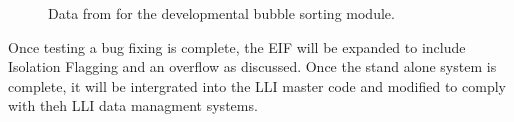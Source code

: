 		\begin{figure}[h]
			\centering
			\caption{Data from for the developmental bubble sorting module.}
			\label{fig:bubble_data_flow}
		\end{figure}

		Once testing a bug fixing is complete, the EIF will be expanded to include Isolation Flagging and an overflow as discussed.
		Once the stand alone system is complete, it will be intergrated into the LLI master code and modified to comply with theh LLI data managment systems.